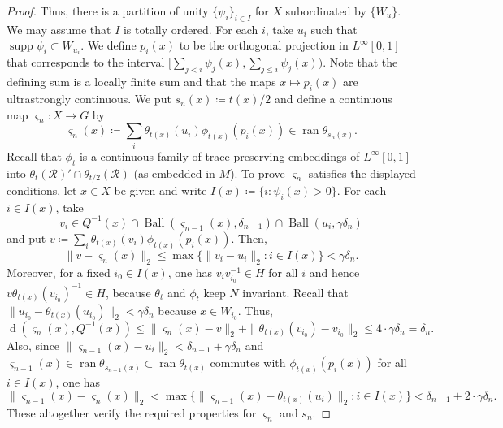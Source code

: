 \documentclass[10pt,a4paper]{amsart}
\DeclareMathOperator{\Ball}{Ball}
\DeclareMathOperator{\dist}{d}
\DeclareMathOperator{\ran}{ran}
\DeclareMathOperator{\supp}{supp}
\newcommand{\cR}{\mathcal{R}}
\newcommand{\vs}{\varsigma}
\begin{document}
\begin{proof}
Thus, there is a partition of unity $\{\psi_i\}_{i\in I}$ for $X$ 
subordinated by $\{ W_u\}$. 
We may assume that $I$ is totally ordered. 
For each $i$, take $u_i$ such that $\supp\psi_i\subset W_{u_i}$. 
We define $p_i(x)$ to be the orthogonal projection in $L^\infty[0,1]$ that 
corresponds to the interval $[\sum_{j<i}\psi_j(x), \sum_{j\le i}\psi_j(x))$. 
Note that the defining sum is a locally finite sum and that 
the maps $x\mapsto p_i(x)$ are ultrastrongly continuous. 
We put $s_n(x)\coloneqq t(x)/2$ and define 
a continuous map $\vs_n\colon X\to G$ by 
\[
\vs_n(x) \coloneqq \sum_i \theta_{t(x)}(u_i)\phi_{t(x)}(p_i(x)) \in \ran\theta_{s_n(x)}.
\]
Recall that $\phi_t$ is a continuous family of 
trace-preserving embeddings of $L^\infty[0,1]$ 
into $\theta_t(\cR)'\cap\theta_{t/2}(\cR)$ 
(as embedded in $M$). 
To prove $\vs_n$ satisfies the displayed conditions, 
let $x\in X$ be given and write $I(x)\coloneqq\{ i : \psi_i(x)>0\}$. 
For each $i\in I(x)$, take 
\[
v_i \in Q^{-1}(x) \cap \Ball(\vs_{n-1}(x), \delta_{n-1}) \cap \Ball(u_i, \gamma\delta_n) 
\]
and put $v\coloneqq\sum_i \theta_{t(x)}(v_i)\phi_{t(x)}(p_i(x))$. 
Then, 
\[
\| v- \vs_n(x) \|_2\le \max\{\| v_i-u_i\|_2 : i\in I(x)\}< \gamma\delta_n.
\]
Moreover, for a fixed $i_0\in I(x)$, one has  
$v_iv_{i_0}^{-1} \in H$ for all $i$ and 
hence $v\theta_{t(x)}(v_{i_0})^{-1}\in H$, because 
$\theta_t$ and $\phi_t$ keep $N$ invariant. 
Recall that $\| u_{i_0} - \theta_{t(x)}(u_{i_0})\|_2 < \gamma\delta_n$ because 
$x\in W_{i_0}$.
Thus, 
\[
\dist( \vs_n(x), Q^{-1}(x) ) \le \| \vs_n(x) - v \|_2 + \| \theta_{t(x)}(v_{i_0})-v_{i_0}\|_2
\le 4\cdot \gamma\delta_n=\delta_n.
\]
Also, since 
$\|  \vs_{n-1}(x) - u_i\|_2 < \delta_{n-1}+\gamma\delta_n$ and 
$\vs_{n-1}(x) \in \ran\theta_{s_{n-1}(x)}\subset \ran\theta_{t(x)}$ 
commutes with $\phi_{t(x)}(p_i(x))$ for all $i\in I(x)$,
one has 
\[
\|\vs_{n-1}(x)-\vs_n(x)\|_2<\max\{ \| \vs_{n-1}(x) - \theta_{t(x)}(u_i) \|_2 : i\in I(x) \}
 < \delta_{n-1}+2\cdot\gamma\delta_n.
\]
These altogether verify the required properties for $\vs_n$ and $s_n$. 
\end{proof}
\end{document}
